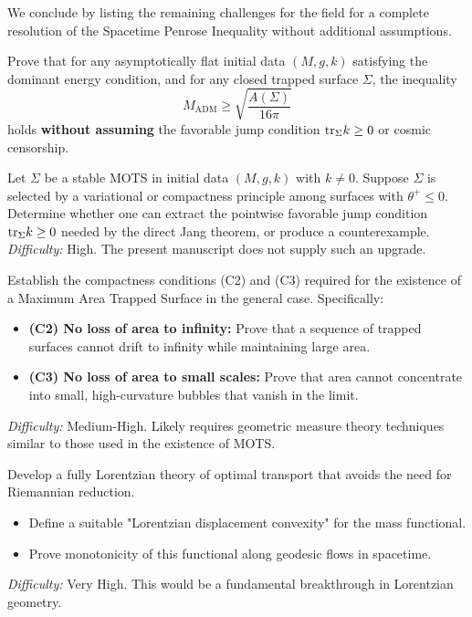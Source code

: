 We conclude by listing the remaining challenges for the field for a complete resolution of the Spacetime Penrose Inequality without additional assumptions.

\begin{openproblem}
Prove that for any asymptotically flat initial data $(M, g, k)$ satisfying the dominant energy condition, and for any closed trapped surface $\Sigma$, the inequality
\[ M_{\mathrm{ADM}} \ge \sqrt{\frac{A(\Sigma)}{16\pi}} \]
holds \textbf{without assuming} the favorable jump condition $\mathrm{tr}_\Sigma k \ge 0$ or cosmic censorship.
\end{openproblem}

\begin{openproblem}
Let $\Sigma$ be a stable MOTS in initial data $(M, g, k)$ with $k \neq 0$. Suppose $\Sigma$ is selected by a variational or compactness principle among surfaces with $\theta^+ \le 0$. Determine whether one can extract the pointwise favorable jump condition $\mathrm{tr}_\Sigma k \ge 0$ needed by the direct Jang theorem, or produce a counterexample.
\textit{Difficulty:} High. The present manuscript does not supply such an upgrade.
\end{openproblem}

\begin{openproblem}
Establish the compactness conditions (C2) and (C3) required for the existence of a Maximum Area Trapped Surface in the general case. Specifically:
\begin{itemize}
    \item \textbf{(C2) No loss of area to infinity:} Prove that a sequence of trapped surfaces cannot drift to infinity while maintaining large area.
    \item \textbf{(C3) No loss of area to small scales:} Prove that area cannot concentrate into small, high-curvature bubbles that vanish in the limit.
\end{itemize}
\textit{Difficulty:} Medium-High. Likely requires geometric measure theory techniques similar to those used in the existence of MOTS.
\end{openproblem}

\begin{openproblem}
Develop a fully Lorentzian theory of optimal transport that avoids the need for Riemannian reduction.
\begin{itemize}
    \item Define a suitable "Lorentzian displacement convexity" for the mass functional.
    \item Prove monotonicity of this functional along geodesic flows in spacetime.
\end{itemize}
\textit{Difficulty:} Very High. This would be a fundamental breakthrough in Lorentzian geometry.
\end{openproblem}


